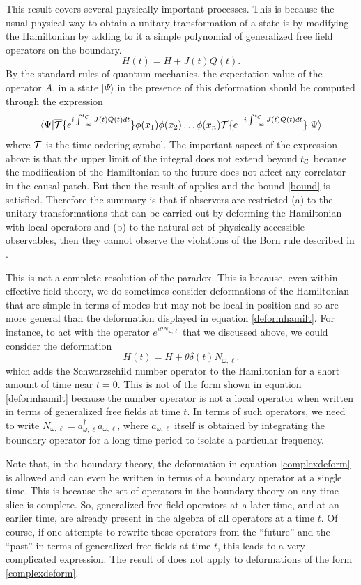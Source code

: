 \documentclass[12pt]{article}
\def\schwarzn{N}
\newcommand{\cop}[1]{#1}
\newcommand{\al}{\cop{A}} %
\def\tcaus{t_{\cal C}}
\newcommand{\be}{\begin{equation}}
\newcommand{\ee}{\end{equation}}
\begin{document}
This result covers several physically important processes. This is because the usual physical way to obtain a unitary transformation of a state is by modifying the Hamiltonian by adding to it a simple polynomial of generalized free field operators on the boundary.
\be
\label{deformhamilt}
H(t) =  H + J(t) Q(t).
\ee
By the standard rules of quantum mechanics, the expectation value of the operator $\al$, in a state $|\Psi \rangle$ in the presence of this deformation should be computed through the expression
\be
\langle \Psi| \overline{{\cal T}} \{e^{i \int_{-\infty}^{\tcaus} J(t) Q(t) d t}  \} \phi(x_1) \phi(x_2) \ldots \phi(x_n) {\cal T}\{e^{-i \int_{-\infty}^{\tcaus} J(t) Q(t) d t} \} | \Psi \rangle
\ee
where ${\cal T}$ is the time-ordering symbol. The important aspect of the expression above is that the upper limit of the integral does not extend beyond $\tcaus$ because the modification of the Hamiltonian to the future does not
affect any correlator in the causal patch.  But then the result of \cite{Raju:2016vsu} applies and the bound \eqref{bound} is satisfied. Therefore the summary is that if observers are restricted (a) to the unitary transformations that can be carried out by deforming the Hamiltonian with local operators and (b) to the natural set of physically accessible observables, then they cannot observe the  violations of the Born rule described in \cite{Marolf:2015dia}. 

This is not a complete resolution of the paradox. This is because, even within effective field theory, we  do sometimes consider deformations of the Hamiltonian that are simple in terms of modes but may not be local in position and so are more general than the deformation displayed in equation \eqref{deformhamilt}.
For instance, to act with the operator $e^{i \theta \schwarzn_{\omega, \ell}}$ that we discussed above, we could consider the deformation
\be
\label{complexdeform}
H(t) = H + \theta \delta(t)  \schwarzn_{\omega, \ell}.
\ee
which adds the Schwarzschild number operator 
to the Hamiltonian for a short amount of time near $t = 0$. 
This is not of the form shown in equation \eqref{deformhamilt} because the number operator is not a local operator when written in terms of generalized free fields at time $t$.  In terms of such operators, we need to write $\schwarzn_{\omega, \ell} = a_{\omega, \ell}^{\dagger} a_{\omega, \ell}$, where $a_{\omega, \ell}$ itself is obtained by integrating the boundary operator for a long time period to isolate a particular frequency.

Note that, in the boundary theory, the deformation in equation \eqref{complexdeform} is allowed and can even be written in terms of a boundary operator at a single time. This is because the set of operators in the boundary theory on any time slice is complete.
So, generalized free field operators at a later time, and at an earlier time, are already present in the algebra of all operators at a time $t$. Of course, if one attempts to rewrite  these operators from the ``future'' and the ``past'' in terms of generalized free fields at time $t$, this leads to a very complicated expression.
The result of \cite{Raju:2016vsu} does not apply to deformations of the form \eqref{complexdeform}. 
\end{document}
